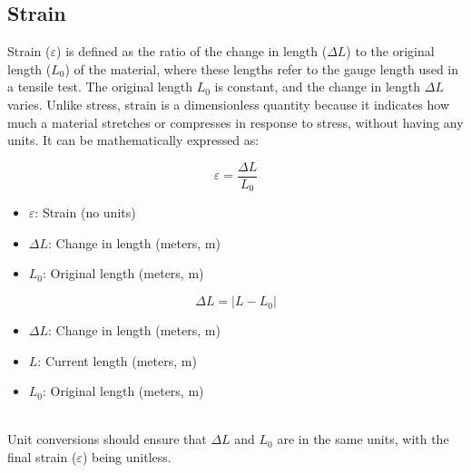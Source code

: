 \documentclass{article}
\begin{document}
        \subsection{Strain}
        Strain ($\varepsilon$) is defined as the ratio of the change in length ($\Delta L$) to the original length ($L_0$) of the material, where these lengths refer to the gauge length used in a tensile test. The original length \(L_0\) is constant, and the change in length \(\Delta L\) varies. Unlike stress, strain is a dimensionless quantity because it indicates how much a material stretches or compresses in response to stress, without having any units. It can be mathematically expressed as:\\[8pt]
        
        \begin{minipage}{0.48\textwidth}
            \begin{equation}
                \varepsilon = \frac{\Delta L}{L_0}
                \label{eq:stress}
            \end{equation}
            \begin{itemize}[left=0pt,itemsep=-1mm]
                \item \( \varepsilon \): Strain (no units)
                \item \( \Delta L \): Change in length (meters, \(\text{m}\))
                \item \( L_0 \): Original length (meters, \(\text{m}\))    
            \end{itemize}
        \end{minipage}\hfill
        \begin{minipage}{0.48\textwidth}
            \begin{equation}
                \Delta L = \left| L - L_0 \right|
                \label{eq:deltaL}
            \end{equation}
            \begin{itemize}[left=0pt,itemsep=-1mm]
                \item \( \Delta L \): Change in length (meters, \(\text{m}\))
                \item \( L \): Current length (meters, \(\text{m}\))\footnotemark
                \item \( L_0 \): Original length (meters, \(\text{m}\))
            \end{itemize}
        \end{minipage}\\[8pt]
        Unit conversions should ensure that $\Delta L$ and $L_0$ are in the same units, with the final strain ($\varepsilon$) being unitless.\\[8pt]
\end{document}
